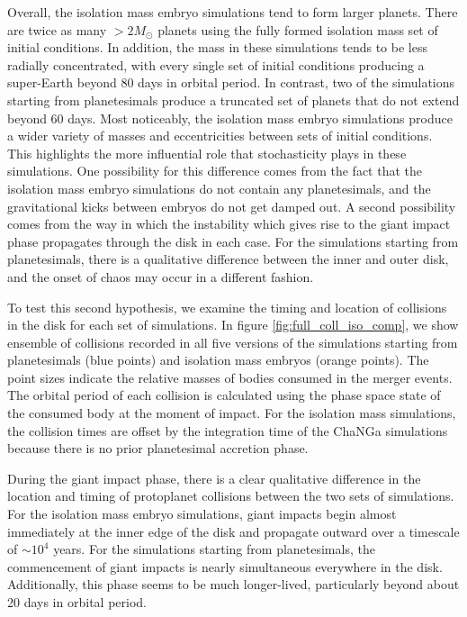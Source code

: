 Overall, the isolation mass embryo simulations tend to form larger planets. There are twice as many $> 2 M_{\odot}$ planets using the fully formed isolation mass set of initial conditions. In addition, the mass in these simulations tends to be less radially concentrated, with every single set of initial conditions producing a super-Earth beyond 80 days in orbital period. In contrast, two of the simulations starting from planetesimals produce a truncated set of planets that do not extend beyond 60 days. Most noticeably, the isolation mass embryo simulations produce a wider variety of masses and eccentricities between sets of initial conditions. This highlights the more influential role that stochasticity plays in these simulations. One possibility for this difference comes from the fact that the isolation mass embryo simulations do not contain any planetesimals, and the gravitational kicks between embryos do not get damped out. A second possibility comes from the way in which the instability which gives rise to the giant impact phase propagates through the disk in each case. For the simulations starting from planetesimals, there is a qualitative difference between the inner and outer disk, and the onset of chaos may occur in a different fashion.

To test this second hypothesis, we examine the timing and location of collisions in the disk for each set of simulations. In figure \ref{fig:full_coll_iso_comp}, we show ensemble of collisions recorded in all five versions of the simulations starting from planetesimals (blue points) and isolation mass embryos (orange points). The point sizes indicate the relative masses of bodies consumed in the merger events. The orbital period of each collision is calculated using the phase space state of the consumed body at the moment of impact. For the isolation mass simulations, the collision times are offset by the integration time of the {\sc ChaNGa} simulations because there is no prior planetesimal accretion phase.

During the giant impact phase, there is a clear qualitative difference in the location and timing of protoplanet collisions between the two sets of simulations. For the isolation mass embryo simulations, giant impacts begin almost immediately at the inner edge of the disk and propagate outward over a timescale of $\sim 10^{4}$ years. For the simulations starting from planetesimals, the commencement of giant impacts is nearly simultaneous everywhere in the disk. Additionally, this phase seems to be much longer-lived, particularly beyond about 20 days in orbital period.

